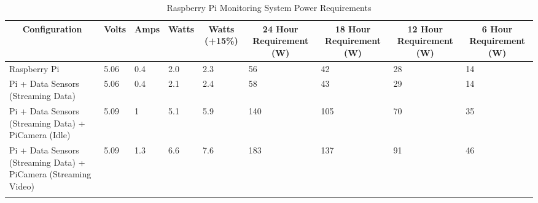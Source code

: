 \documentclass[10pt,a4paper]{article}
\begin{document}
\begin{table}[]
\centering
\begin{tabular}{lllllllll}
\hline
\multicolumn{1}{c}{\textbf{Configuration}}                      & \multicolumn{1}{c}{\textbf{Volts}} & \multicolumn{1}{c}{\textbf{Amps}} & \multicolumn{1}{c}{\textbf{Watts}} & \multicolumn{1}{c}{\textbf{Watts (+15\%)}} & \multicolumn{1}{c}{\textbf{24 Hour Requirement (W)}} & \multicolumn{1}{c}{\textbf{18 Hour Requirement (W)}} & \multicolumn{1}{c}{\textbf{12 Hour Requirement (W)}} & \multicolumn{1}{c}{\textbf{6 Hour Requirement (W)}} \\ \hline
Raspberry Pi                                                    & 5.06                               & 0.4                               & 2.0                                & 2.3                                        & 56                                                   & 42                                                   & 28                                                   & 14                                                  \\
Pi + Data Sensors (Streaming Data)                              & 5.06                               & 0.4                               & 2.1                                & 2.4                                        & 58                                                   & 43                                                   & 29                                                   & 14                                                  \\
Pi + Data Sensors (Streaming Data) + PiCamera (Idle)            & 5.09                               & 1                                 & 5.1                                & 5.9                                        & 140                                                  & 105                                                  & 70                                                   & 35                                                  \\
Pi + Data Sensors (Streaming Data) + PiCamera (Streaming Video) & 5.09                               & 1.3                               & 6.6                                & 7.6                                        & 183                                                  & 137                                                  & 91                                                   & 46                                                  \\
                                                                &                                    &                                   &                                    &                                            &                                                      &                                                      &                                                      &                                                     \\ \hline
\end{tabular}
\caption{Raspberry Pi Monitoring System Power Requirements}
\label{tab:powerRequirements}
\end{table}
\end{document}

